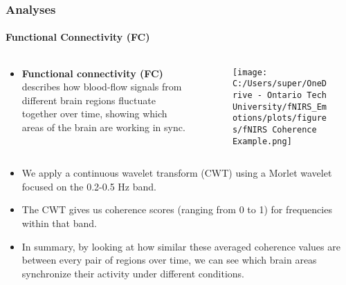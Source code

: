 \documentclass{beamer}
\begin{document}
\begin{frame}
    \frametitle{Analyses}
    \framesubtitle{Functional Connectivity (FC)}
    \begin{columns}
        \begin{column}{0.39\textwidth}
            \begin{itemize}
                \small
                \item \textbf{Functional connectivity (FC)} describes how blood-flow signals from different brain regions fluctuate together over time, showing which areas of the brain are working in sync.
            \end{itemize}
        \end{column}
        \begin{column}{0.6\textwidth}
            \begin{figure}
                  \centering
                    \texttt{[image: C:/Users/super/OneDrive - Ontario Tech University/fNIRS\_Emotions/plots/figures/fNIRS Coherence Example.png]}
            \end{figure}
        \end{column}
    \end{columns}
    \begin{itemize}
        \small
        \item We apply a continuous wavelet transform (CWT) using a Morlet wavelet focused on the 0.2-0.5 Hz band.
        \item The CWT gives us coherence scores (ranging from 0 to 1) for frequencies within that band. 
        \item In summary, by looking at how similar these averaged coherence values are between every pair of regions over time, we can see which brain areas synchronize their activity under different conditions.
    \end{itemize}
\end{frame}
\end{document}
